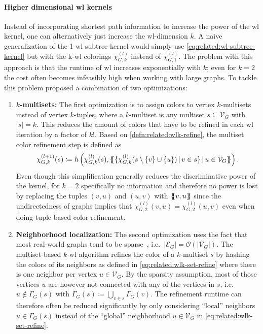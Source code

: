 \paragraph{Higher dimensional \ac{wl} kernels}
Instead of incorporating shortest path information to increase the power of the \ac{wl} kernel, one can alternatively just increase the \acs{wl}-dimension $k$.
A na{\"\i}ve generalization of the 1-\acs{wl} subtree kernel would simply use \cref{eq:related:wl-subtree-kernel} but with the k-\acs{wl} colorings $\chi_{G,k}^{(l)}$ instead of $\chi_{G,1}^{(l)}$.
The problem with this approach is that the runtime of \ac{wl} increases exponentially with $k$;
even for $k = 2$ the cost often becomes infeasibly high when working with large graphs.
To tackle this problem \citet{Morris2017} proposed a combination of two optimizations:
\begin{enumerate}[label=\textbf{\arabic*.}]
	\item \textbf{$k$-multisets:}
		The first optimization is to assign colors to vertex $k$-multisets instead of vertex $k$-tuples, where a $k$-multiset is any multiset $s \subseteq \mathcal{V}_G$ with ${|s|} = k$.
		This reduces the amount of colors that have to be refined in each \ac{wl} iteration by a factor of $k!$. %
		Based on \cref{defn:related:wlk-refine}, the multiset color refinement step is defined as
		\begin{align}
			\chi_{G,k}^{(l+1)}(s) \coloneqq h\left(\chi_{G,k}^{(l)}(s), \ldblbrace \{ \chi_{G,k}^{(l)}(s \setminus \{v\} \cup \{u\})\, |\, v \in s \}\, |\, u \in \mathcal{V}_G \rdblbrace\right) \text{.} \label{eq:related:wlk-set-refine} %
		\end{align}
		Even though this simplification generally reduces the discriminative power of the kernel, for $k = 2$ specifically no information and therefore no power is lost by replacing the tuples $(v, u)$ and $(u, v)$ with $\ldblbrace v, u \rdblbrace$ since the undirectedness of graphs implies that $\chi_{G,2}^{(l)}(v, u) = \chi_{G,2}^{(l)}(u, v)$ even when doing tuple-based color refinement.
	\item \textbf{Neighborhood localization:}
		The second optimization uses the fact that most real-world graphs tend to be sparse~\cite{Chung2010}, i.e.\ ${|\mathcal{E}_G|} = \mathcal{O}(|\mathcal{V}_G|)$.
		The multiset-based $k$-\acs{wl} algorithm refines the color of a $k$-multiset $s$ by hashing the colors of its neighbors as defined in \cref{eq:related:wlk-set-refine} where there is one neighbor per vertex $u \in \mathcal{V}_G$.
		By the sparsity assumption, most of those vertices $u$ are however not connected with any of the vertices in $s$, i.e.\ $u \notin \Gamma_G(s)$ with $\Gamma_G(s) \coloneqq \bigcup_{v \in s} \Gamma_G(v)$.
		The refinement runtime can therefore often be reduced significantly by only considering ``local'' neighbors $u \in \Gamma_G(s)$ instead of the ``global'' neighborhood $u \in \mathcal{V}_G$ in \cref{eq:related:wlk-set-refine}.
\end{enumerate}
